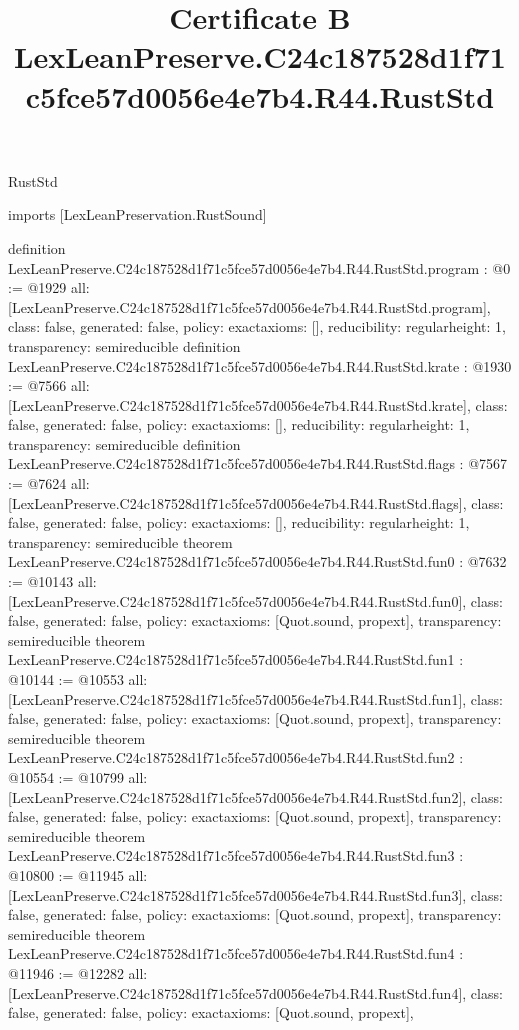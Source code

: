 \begin{lexlean}{RustStd}
\title{Certificate B LexLeanPreserve.C24c187528d1f71c5fce57d0056e4e7b4.R44.RustStd}
\begin{coremodule}
imports [LexLeanPreservation.RustSound]

definition LexLeanPreserve.C24c187528d1f71c5fce57d0056e4e7b4.R44.RustStd.program : @0 := @1929 {
  all: [LexLeanPreserve.C24c187528d1f71c5fce57d0056e4e7b4.R44.RustStd.program],
  class: false,
  generated: false,
  policy: exact{axioms: []},
  reducibility: regular{height: 1},
  transparency: semireducible
}
definition LexLeanPreserve.C24c187528d1f71c5fce57d0056e4e7b4.R44.RustStd.krate : @1930 := @7566 {
  all: [LexLeanPreserve.C24c187528d1f71c5fce57d0056e4e7b4.R44.RustStd.krate],
  class: false,
  generated: false,
  policy: exact{axioms: []},
  reducibility: regular{height: 1},
  transparency: semireducible
}
definition LexLeanPreserve.C24c187528d1f71c5fce57d0056e4e7b4.R44.RustStd.flags : @7567 := @7624 {
  all: [LexLeanPreserve.C24c187528d1f71c5fce57d0056e4e7b4.R44.RustStd.flags],
  class: false,
  generated: false,
  policy: exact{axioms: []},
  reducibility: regular{height: 1},
  transparency: semireducible
}
theorem LexLeanPreserve.C24c187528d1f71c5fce57d0056e4e7b4.R44.RustStd.fun0 : @7632 := @10143 {
  all: [LexLeanPreserve.C24c187528d1f71c5fce57d0056e4e7b4.R44.RustStd.fun0],
  class: false,
  generated: false,
  policy: exact{axioms: [Quot.sound, propext]},
  transparency: semireducible
}
theorem LexLeanPreserve.C24c187528d1f71c5fce57d0056e4e7b4.R44.RustStd.fun1 : @10144 := @10553 {
  all: [LexLeanPreserve.C24c187528d1f71c5fce57d0056e4e7b4.R44.RustStd.fun1],
  class: false,
  generated: false,
  policy: exact{axioms: [Quot.sound, propext]},
  transparency: semireducible
}
theorem LexLeanPreserve.C24c187528d1f71c5fce57d0056e4e7b4.R44.RustStd.fun2 : @10554 := @10799 {
  all: [LexLeanPreserve.C24c187528d1f71c5fce57d0056e4e7b4.R44.RustStd.fun2],
  class: false,
  generated: false,
  policy: exact{axioms: [Quot.sound, propext]},
  transparency: semireducible
}
theorem LexLeanPreserve.C24c187528d1f71c5fce57d0056e4e7b4.R44.RustStd.fun3 : @10800 := @11945 {
  all: [LexLeanPreserve.C24c187528d1f71c5fce57d0056e4e7b4.R44.RustStd.fun3],
  class: false,
  generated: false,
  policy: exact{axioms: [Quot.sound, propext]},
  transparency: semireducible
}
theorem LexLeanPreserve.C24c187528d1f71c5fce57d0056e4e7b4.R44.RustStd.fun4 : @11946 := @12282 {
  all: [LexLeanPreserve.C24c187528d1f71c5fce57d0056e4e7b4.R44.RustStd.fun4],
  class: false,
  generated: false,
  policy: exact{axioms: [Quot.sound, propext]},
}
\end{coremodule}
\end{lexlean}
